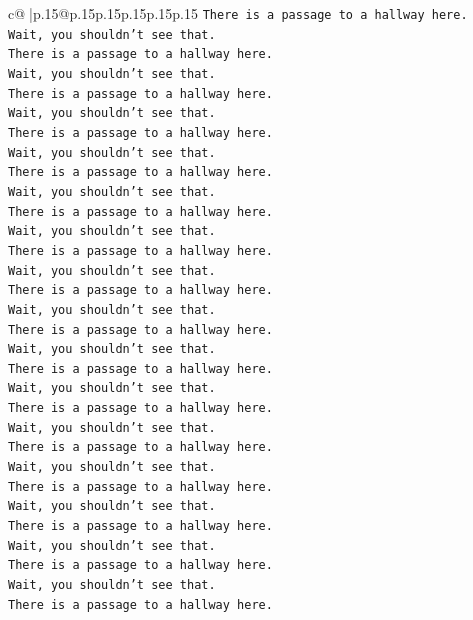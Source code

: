 \documentclass{article}
\begin{document}
{\begin{supertabular}{c@{$\;$}|p{.15\linewidth}@{}p{.15\linewidth}p{.15\linewidth}p{.15\linewidth}p{.15\linewidth}p{.15\linewidth}}
{{{\texttt{There is a passage to a hallway here.} \\
\texttt{Wait, you shouldn't see that.} \\
\texttt{There is a passage to a hallway here.} \\
\texttt{Wait, you shouldn't see that.} \\
\texttt{There is a passage to a hallway here.} \\
\texttt{Wait, you shouldn't see that.} \\
\texttt{There is a passage to a hallway here.} \\
\texttt{Wait, you shouldn't see that.} \\
\texttt{There is a passage to a hallway here.} \\
\texttt{Wait, you shouldn't see that.} \\
\texttt{There is a passage to a hallway here.} \\
\texttt{Wait, you shouldn't see that.} \\
\texttt{There is a passage to a hallway here.} \\
\texttt{Wait, you shouldn't see that.} \\
\texttt{There is a passage to a hallway here.} \\
\texttt{Wait, you shouldn't see that.} \\
\texttt{There is a passage to a hallway here.} \\
\texttt{Wait, you shouldn't see that.} \\
\texttt{There is a passage to a hallway here.} \\
\texttt{Wait, you shouldn't see that.} \\
\texttt{There is a passage to a hallway here.} \\
\texttt{Wait, you shouldn't see that.} \\
\texttt{There is a passage to a hallway here.} \\
\texttt{Wait, you shouldn't see that.} \\
\texttt{There is a passage to a hallway here.} \\
\texttt{Wait, you shouldn't see that.} \\
\texttt{There is a passage to a hallway here.} \\
\texttt{Wait, you shouldn't see that.} \\
\texttt{There is a passage to a hallway here.} \\
\texttt{Wait, you shouldn't see that.} \\
\texttt{There is a passage to a hallway here.} \\
}}}
\end{supertabular}}
\end{document}
